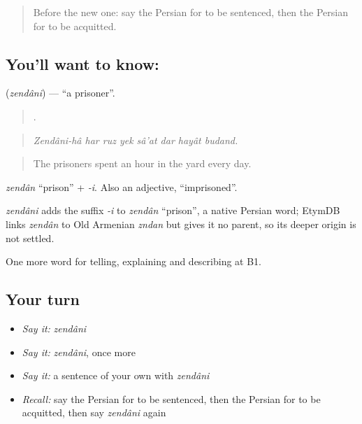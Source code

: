 \label{lesson:FA-C322-zendani}



\begin{quote}
Before the new one: say the Persian for to be sentenced, then the Persian for to be acquitted.
\end{quote}

\subsection*{You'll want to know: }
\textbf{} (\emph{zendâni}) — \textquotedblleft{}a prisoner\textquotedblright{}.

\begin{quote}
        .
\end{quote}

\begin{quote}
\emph{Zendâni-hâ har ruz yek sâ'at dar hayât budand.}
\end{quote}

\begin{quote}
The prisoners spent an hour in the yard every day.
\end{quote}

\emph{zendân} \textquotedblleft{}prison\textquotedblright{} + \emph{-i}. Also an adjective, \textquotedblleft{}imprisoned\textquotedblright{}.

\begin{cousinweb}
\emph{zendâni} adds the suffix \emph{-i} to \emph{zendân} \textquotedblleft{}prison\textquotedblright{}, a native Persian word; EtymDB links \emph{zendân} to Old Armenian \emph{zndan} but gives it no parent, so its deeper origin is not settled.
\end{cousinweb}

\begin{grammarlens}[title={What you've built}]
One more word for telling, explaining and describing at B1.
\end{grammarlens}

\subsection*{Your turn}
\begin{itemize}
\raggedright
  \item \emph{Say it:} \emph{zendâni}
  \item \emph{Say it:} \emph{zendâni}, once more
  \item \emph{Say it:} a sentence of your own with \emph{zendâni}
  \item \emph{Recall:} say the Persian for to be sentenced, then the Persian for to be acquitted, then say \emph{zendâni} again
\end{itemize}

